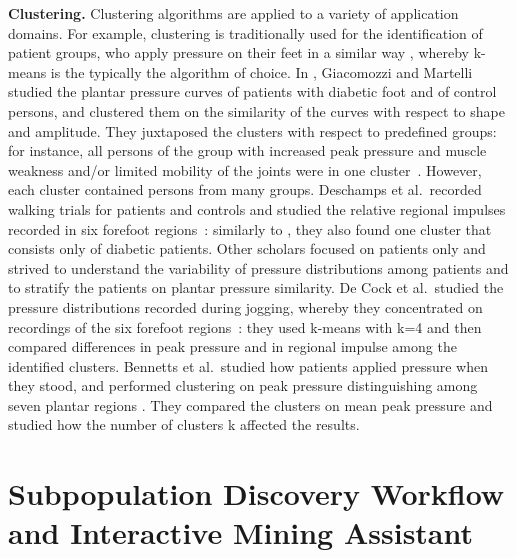 \documentclass[
]{book}
\begin{document}
\textbf{Clustering.} Clustering algorithms are applied to a variety of application domains.
For example, clustering is traditionally used for the identification of patient groups, who apply pressure on their feet in a similar way \autocite{BennettsEtAl:Biomechanics2013,DeCockEtAl:FootTypeClusteringPlantarPressure2006,DeschampsEtAL:KMeansDiabeticFoot2013,GiacomozziMartelli:PeakPressure2006}, whereby k-means is the typically the algorithm of choice.
In \autocite{GiacomozziMartelli:PeakPressure2006}, Giacomozzi and Martelli
studied the plantar pressure curves of patients with diabetic foot and of control persons, and clustered them on the similarity of the curves with respect to shape and amplitude. They juxtaposed the clusters with respect to predefined groups: for instance, all persons of the group with increased peak pressure and muscle weakness and/or limited mobility of the joints were in one cluster~\autocite{GiacomozziMartelli:PeakPressure2006}.
However, each cluster contained persons from many groups.
Deschamps et al.~recorded walking trials for patients and controls and studied the relative regional impulses recorded in six forefoot regions~\autocite{DeschampsEtAL:KMeansDiabeticFoot2013}: similarly to \autocite{GiacomozziMartelli:PeakPressure2006}, they also found one cluster that consists only of diabetic patients.
Other scholars focused on patients only and strived to understand the variability of pressure distributions among patients and to stratify the patients on plantar pressure similarity.
De Cock et al.~studied the pressure distributions recorded during jogging, whereby they concentrated on recordings of the six forefoot regions~\autocite{DeCockEtAl:FootTypeClusteringPlantarPressure2006}: they used k-means with k=4 and then
compared differences in peak pressure and in regional impulse among the identified clusters.
Bennetts et al.~studied how patients applied pressure when they stood, and performed clustering on peak pressure
distinguishing among seven plantar regions \autocite{BennettsEtAl:Biomechanics2013}.
They compared the clusters on mean peak pressure and studied how the number of clusters k affected the results.

\hypertarget{subpopulation-discovery-workflow-and-interactive-mining-assistant}{%
\section{Subpopulation Discovery Workflow and Interactive Mining Assistant}\label{subpopulation-discovery-workflow-and-interactive-mining-assistant}}
\end{document}
